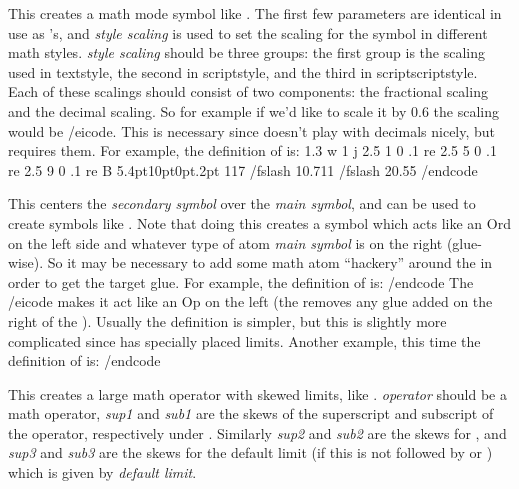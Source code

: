  This creates a math
mode symbol like \macroname\divs.
The first few parameters are identical in use as \macroname\pdf@drawing@macro's, and {\it style scaling} is used to set the
scaling for the symbol in different math styles.
{\it style scaling} should be three groups: the first group is the scaling used in textstyle, the second in scriptstyle, and
the third in scriptscriptstyle.
Each of these scalings should consist of two components: the fractional scaling and the decimal scaling.
So for example if we'd like to scale it by $0.6$ the scaling would be /eicode.
This is necessary since \macroname\dimexpr{} doesn't play with decimals nicely, but \macroname\pdfliteral{} requires them.
For example, the definition of \macroname\divs{} is:
\begincode
{}
    {1.3 w 1 j
    2.5 1 0 .1 re
    2.5 5 0 .1 re
    2.5 9 0 .1 re B}
    {5.4pt}{10pt}{0pt}{.2pt}
    {{1}{1}}{{7 /fslash 10}{.7}}{{11 /fslash 20}{.55}}
\def\divs{\mathrel{\@divs}}     %
/endcode
\emacroexp

 This centers the {\it secondary symbol} over the {\it main symbol}, and
can be used to create symbols like \macroname\aint.
Note that doing this creates a symbol which acts like an Ord on the left side and whatever type of atom {\it main symbol} is
on the right (glue-wise).
So it may be necessary to add some math atom ``hackery'' around the \macroname\putsym{} in order to get the target glue.
For example, the definition of \macroname\aint{} is:
\begincode
\def\aint{\mathop{}\mathclose{}\putsym\int-}
/endcode
The \icode \mathop{}\mathclose{}/eicode{} makes it act like an Op on the left (the \macroname\mathclose{} removes any glue
added on the right of the \macroname\mathop).
Usually the definition is simpler, but this is slightly more complicated since \macroname\int{} has specially placed limits.
Another example, this time the definition of \macroname\bigdcup{} is:
\begincode
\def\bigdcup{\mathop{\putsym\bigcup\cdot}}
/endcode
\emacroexp

This creates a large math operator with skewed limits, like \macroname\int.
{\it operator} should be a math operator, {\it sup1} and {\it sub1} are the skews of the superscript and subscript of the
operator, respectively under \macroname\nolimits.
Similarly {\it sup2} and {\it sub2} are the skews for \macroname\limits, and {\it sup3} and {\it sub3} are the
skews for the default limit (if this is not followed by \macroname\limits{} or \macroname\nolimits) which is given by
{\it default limit}.

